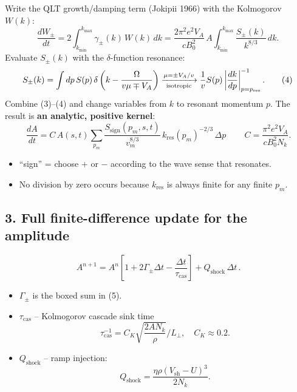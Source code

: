 Write the QLT growth/damping term (Jokipii 1966) with the Kolmogorov \(W(k)\):
\[
\frac{dW_{\pm}}{dt}
      = 2 \int_{k_{\min}}^{k_{\max}} \gamma_\pm(k)\,W(k)\,dk
      = \frac{2\pi^{2}e^{2}V_A}{cB_0^{2}}\, A \int_{k_{\min}}^{k_{\max}} \frac{S_\pm(k)}{k^{8/3}}\,dk. \tag{3}
\]
Evaluate \(S_\pm(k)\) with the \(\delta\)-function resonance:
\[
S_\pm(k) = \int dp\, S(p)\,
          \delta\left(k - \frac{\Omega}{v\mu \mp V_A}\right)
       \xrightarrow[\text{isotropic}]{\mu = \pm V_A/v}
       \frac{1}{v} S(p) \left| \frac{dk}{dp} \right|^{-1}_{p = p_{\rm res}}. \tag{4}
\]
Combine (3)–(4) and change variables from \(k\) to resonant momentum \(p\). The result is \textbf{an analytic, positive kernel}:
\[
\boxed{\, \frac{dA}{dt} = C
               \, A(s,t)
               \sum_{p_m} 
               \frac{S_{\text{sign}}(p_m,s,t)}
                    {v_m^{8/3}}\,
               k_{\text{res}}(p_m)^{-2/3}\, \Delta p \,}
\qquad
C = \frac{\pi^{2} e^{2} V_A}{c B_0^{2} N_k}. \tag{5}
\]
\begin{itemize}
\item ``sign'' = choose \(+\) or \(-\) according to the wave sense that resonates.
\item No division by zero occurs because \(k_{\text{res}}\) is always finite for any finite \(p_m\).
\end{itemize}

\subsection*{3. Full finite-difference update for the amplitude}
\[
\boxed{\, A^{n+1} = A^{n} \left[ 1 + 2 \Gamma_{\pm} \Delta t
                   - \frac{\Delta t}{\tau_{\text{cas}}} \right]
          + Q_{\text{shock}}\, \Delta t \,}. \tag{6}
\]
\begin{itemize}
\item \( \Gamma_{\pm} \) is the boxed sum in (5).
\item \( \tau_{\text{cas}} \) – Kolmogorov cascade sink time
\[
\tau_{\text{cas}}^{-1} = C_K \sqrt{ \frac{2 A N_k}{\rho} } / L_\perp, \quad C_K \approx 0.2.
\]
\item \( Q_{\text{shock}} \) – ramp injection:
\[
Q_{\text{shock}} = \frac{ \eta \rho (V_{\text{sh}} - U)^3 }{ 2 N_k }.
\]
\end{itemize}

